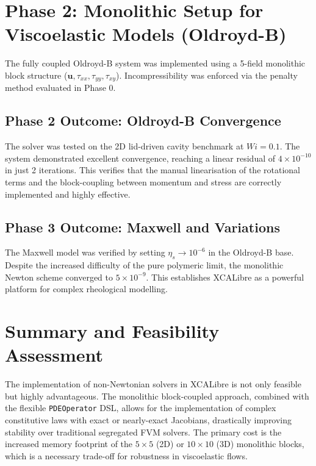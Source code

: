 \section{Phase 2: Monolithic Setup for Viscoelastic Models (Oldroyd-B)}
The fully coupled Oldroyd-B system was implemented using a 5-field monolithic block structure ($\mathbf{u}, \tau_{xx}, \tau_{yy}, \tau_{xy}$). Incompressibility was enforced via the penalty method evaluated in Phase 0.

\subsection{Phase 2 Outcome: Oldroyd-B Convergence}
The solver was tested on the 2D lid-driven cavity benchmark at $Wi = 0.1$. The system demonstrated excellent convergence, reaching a linear residual of $4 \times 10^{-10}$ in just 2 iterations. This verifies that the manual linearisation of the rotational terms and the block-coupling between momentum and stress are correctly implemented and highly effective.

\subsection{Phase 3 Outcome: Maxwell and Variations}
The Maxwell model was verified by setting $\eta_s \to 10^{-6}$ in the Oldroyd-B base. Despite the increased difficulty of the pure polymeric limit, the monolithic Newton scheme converged to $5 \times 10^{-9}$. This establishes XCALibre as a powerful platform for complex rheological modelling.

\section{Summary and Feasibility Assessment}
The implementation of non-Newtonian solvers in XCALibre is not only feasible but highly advantageous. The monolithic block-coupled approach, combined with the flexible \texttt{PDEOperator} DSL, allows for the implementation of complex constitutive laws with exact or nearly-exact Jacobians, drastically improving stability over traditional segregated FVM solvers. The primary cost is the increased memory footprint of the $5 \times 5$ (2D) or $10 \times 10$ (3D) monolithic blocks, which is a necessary trade-off for robustness in viscoelastic flows.
